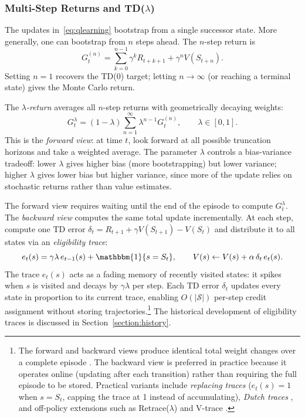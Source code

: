 \subsubsection{Multi-Step Returns and TD($\lambda$)}
\label{sec:td_lambda}

The updates in~\eqref{eq:qlearning} bootstrap from a single successor state. More generally, one can bootstrap from $n$ steps ahead. The $n$-step return is
\begin{equation}
G_t^{(n)} = \sum_{k=0}^{n-1} \gamma^k R_{t+k+1} + \gamma^n V(S_{t+n}).
\label{eq:n_step_return}
\end{equation}
Setting $n=1$ recovers the TD(0) target; letting $n \to \infty$ (or reaching a terminal state) gives the Monte Carlo return.

The \emph{$\lambda$-return} \citep{sutton1988} averages all $n$-step returns with geometrically decaying weights:
\begin{equation}
G_t^\lambda = (1-\lambda) \sum_{n=1}^{\infty} \lambda^{n-1} G_t^{(n)}, \qquad \lambda \in [0,1].
\label{eq:lambda_return}
\end{equation}
This is the \emph{forward view}: at time $t$, look forward at all possible truncation horizons and take a weighted average. The parameter $\lambda$ controls a bias-variance tradeoff: lower $\lambda$ gives higher bias (more bootstrapping) but lower variance; higher $\lambda$ gives lower bias but higher variance, since more of the update relies on stochastic returns rather than value estimates.

The forward view requires waiting until the end of the episode to compute $G_t^\lambda$. The \emph{backward view} computes the same total update incrementally. At each step, compute one TD error $\delta_t = R_{t+1} + \gamma V(S_{t+1}) - V(S_t)$ and distribute it to all states via an \emph{eligibility trace}:
\begin{equation}
e_t(s) = \gamma\lambda\, e_{t-1}(s) + \mathbbm{1}\{s = S_t\}, \qquad V(s) \leftarrow V(s) + \alpha\,\delta_t\,e_t(s).
\label{eq:eligibility_trace}
\end{equation}
The trace $e_t(s)$ acts as a fading memory of recently visited states: it spikes when $s$ is visited and decays by $\gamma\lambda$ per step. Each TD error $\delta_t$ updates every state in proportion to its current trace, enabling $O(|\mathcal{S}|)$ per-step credit assignment without storing trajectories.\footnote{The forward and backward views produce identical total weight changes over a complete episode \citep{sutton1988}. The backward view is preferred in practice because it operates online (updating after each transition) rather than requiring the full episode to be stored. Practical variants include \emph{replacing traces} ($e_t(s) = 1$ when $s = S_t$, capping the trace at 1 instead of accumulating), \emph{Dutch traces} \citep{vanseijen2016}, and off-policy extensions such as Retrace($\lambda$) \citep{munos2016retrace} and V-trace \citep{espeholt2018impala}.} The historical development of eligibility traces is discussed in Section~\ref{section:history}.

